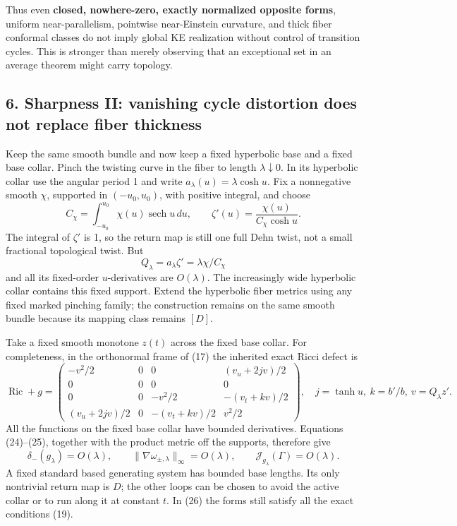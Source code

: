 \documentclass[
  11pt,
]{article}
\begin{document}
Thus even \textbf{closed, nowhere-zero, exactly normalized opposite
forms}, uniform near-parallelism, pointwise near-Einstein curvature, and
thick fiber conformal classes do not imply global KE realization without
control of transition cycles. This is stronger than merely observing
that an exceptional set in an average theorem might carry topology.

\hypertarget{sharpness-ii-vanishing-cycle-distortion-does-not-replace-fiber-thickness}{%
\subsection{6. Sharpness II: vanishing cycle distortion does not replace
fiber
thickness}\label{sharpness-ii-vanishing-cycle-distortion-does-not-replace-fiber-thickness}}

Keep the same smooth bundle and now keep a fixed hyperbolic base and a
fixed base collar. Pinch the twisting curve in the fiber to length
\(\lambda\downarrow0\). In its hyperbolic collar use the angular period
1 and write \(a_\lambda(u)=\lambda\cosh u\). Fix a nonnegative smooth
\(\chi\), supported in \((-u_0,u_0)\), with positive integral, and
choose \[
 C_\chi=\int_{-u_0}^{u_0}\chi(u)\operatorname{sech}u\,du,
 \qquad
 \zeta'(u)=\frac{\chi(u)}{C_\chi\cosh u}.
\tag{23}
\] The integral of \(\zeta'\) is 1, so the return map is still one full
Dehn twist, not a small fractional topological twist. But \[
                     Q_\lambda=a_\lambda\zeta'
                            =\lambda\chi/C_\chi
\tag{24}
\] and all its fixed-order \(u\)-derivatives are \(O(\lambda)\). The
increasingly wide hyperbolic collar contains this fixed support. Extend
the hyperbolic fiber metrics using any fixed marked pinching family; the
construction remains on the same smooth bundle because its mapping class
remains \([D]\).

Take a fixed smooth monotone \(z(t)\) across the fixed base collar. For
completeness, in the orthonormal frame of (17) the inherited exact Ricci
defect is \[
 \operatorname{Ric}+g=
 \begin{pmatrix}
 -v^2/2&0&0&(v_u+2jv)/2\\
 0&0&0&0\\
 0&0&-v^2/2&-(v_t+kv)/2\\
 (v_u+2jv)/2&0&-(v_t+kv)/2&v^2/2
 \end{pmatrix},
 \quad j=\tanh u,\ k=b'/b,\ v=Q_\lambda z'.
\tag{25}
\] All the functions on the fixed base collar have bounded derivatives.
Equations (24)--(25), together with the product metric off the supports,
therefore give \[
 \delta_-(g_\lambda)=O(\lambda),\qquad
 \|\nabla\omega_{\pm,\lambda}\|_\infty=O(\lambda),\qquad
 \mathcal J_{g_\lambda}(\Gamma)=O(\lambda).
\tag{26}
\] A fixed standard based generating system has bounded base lengths.
Its only nontrivial return map is \(D\); the other loops can be chosen
to avoid the active collar or to run along it at constant \(t\). In (26)
the forms still satisfy all the exact conditions (19).
\end{document}
